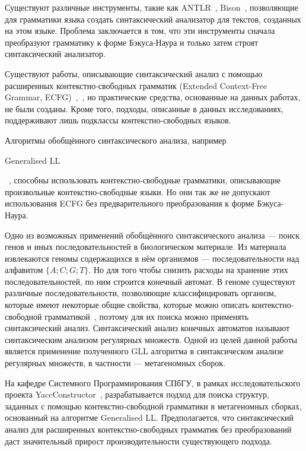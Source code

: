 \documentclass[14pt]{matmex-diploma-custom}
\begin{document}
	Существуют различные инструменты, такие как ANTLR~\cite{ANTLR}, Bison~\cite{Bison},
    позволяющие для грамматики языка создать синтаксический анализатор для текстов, созданных на этом языке.
	Проблема заключается в том, что эти инструменты
	сначала преобразуют грамматику к форме Бэкуса-Наура и только затем
	строят синтаксический анализатор.
	
	Существуют работы, описывающие синтаксический анализ с помощью расширенных
	контекстно-свободных грамматик (Extended Context-Free Grammar, ECFG)~\cite{Breveglieri2014},~\cite{lee1997characterization},
	но практические средства, основанные на данных работах, не были созданы. Кроме того, подходы, описанные
	в данных исследованиях, поддерживают лишь подклассы контекстно-свободных языков.
	
	Алгоритмы обобщённого синтаксического анализа, например
    \begin{english} Generalised LL \end{english}~\cite{scott2010gll}, 
	способны использовать контекстно-свободные грамматики, описывающие произвольные 
	контекстно-свободные языки. Но они так же не допускают использования ECFG 
	без предварительного преобразования к форме Бэкуса-Наура.
	
	Одно из возможных применений обобщённого синтаксического анализа --- поиск генов и иных последовательностей в биологическом материале. 
	Из материала извлекаются геномы содержащихся в нём организмов --- последовательности над алфавитом $\{A;C; G; T\}$.
    Но для того чтобы снизить расходы на хранение этих последовательностей, по ним строится конечный автомат.
    В геноме существуют различные последовательности, позволяющие классифицировать организм, которые имеют некоторые общие свойства, которые можно описать 
    контекстно-свободной грамматикой~\cite{Anderson2013}, поэтому для их поиска можно применять синтаксический анализ.
    Синтаксический анализ конечных автоматов называют 
    синтаксическим анализом регулярных множеств. Одной из целей данной работы является применение
    полученного GLL алгоритма в
	синтаксическом анализе регулярных множеств, в частности --- метагеномных сборок.
	
	На кафедре Системного Программирования СПбГУ, в рамках исследовательского проекта YaccConstructor~\cite{YaccConstructor},
	разрабатывается подход для поиска структур, заданных с помощью контекстно-свободной
	грамматики в метагеномных сборках, основанный на алгоритме Generalised LL.
	Предполагается, что синтаксический анализ для расширенных контекстно-свободных грамматик
    без преобразований даст значительный прирост производительности существующего подхода.
	
\end{document}

